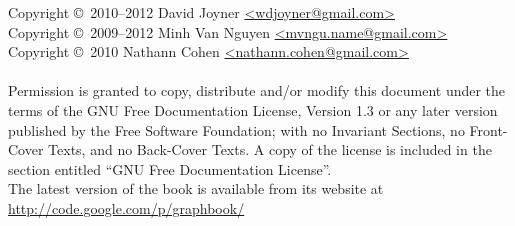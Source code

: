 \noindent Copyright \copyright\ 2010--2012 David Joyner \url{<wdjoyner@gmail.com>} \\
Copyright \copyright\ 2009--2012 Minh Van Nguyen \url{<mvngu.name@gmail.com>} \\
Copyright \copyright\ 2010 Nathann Cohen \url{<nathann.cohen@gmail.com>} \\\\
Permission is granted to copy, distribute and/or modify this document
under the terms of the GNU Free Documentation License, Version 1.3
or any later version published by the Free Software Foundation;
with no Invariant Sections, no Front-Cover Texts, and no
Back-Cover Texts. A copy of the license is included in the section
entitled ``GNU Free Documentation License''. \\

\noindent
The latest version of the book is available from its website at \\

\url{http://code.google.com/p/graphbook/}
